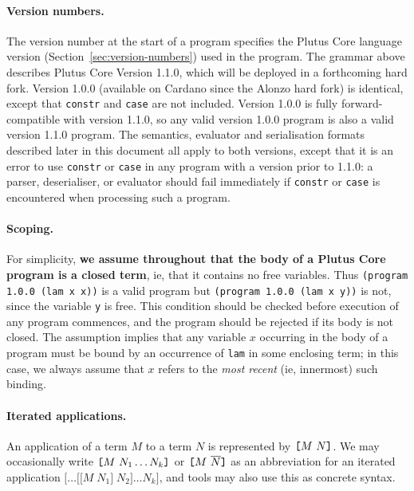 \paragraph{Version numbers.} The version number at the start of a program specifies
the Plutus Core language version (Section~\ref{sec:version-numbers}) used in the
program.  The grammar above describes Plutus Core Version 1.1.0, which will be
deployed in a forthcoming hard fork.  Version 1.0.0 (available on Cardano since
the Alonzo hard fork) is identical, except that \texttt{constr} and
\texttt{case} are not included.  Version 1.0.0 is fully forward-compatible with
version 1.1.0, so any valid version 1.0.0 program is also a valid version 1.1.0
program.  The semantics, evaluator and serialisation formats described later in
this document all apply to both versions, except that it is an error to use
\texttt{constr} or \texttt{case} in any program with a version prior to 1.1.0: a
parser, deserialiser, or evaluator should fail immediately if \texttt{constr} or
\texttt{case} is encountered when processing such a program.


\paragraph{Scoping.} For simplicity, \textbf{we assume throughout that the body of a
Plutus Core program is a closed term}, ie, that it contains no free variables.
Thus \texttt{(program 1.0.0 (lam x x))} is a valid program but \texttt{(program
  1.0.0 (lam x y))} is not, since the variable \texttt{y} is free. This
condition should be checked before execution of any program commences, and the
program should be rejected if its body is not closed.  The assumption implies
that any variable $x$ occurring in the body of a program must be bound by an
occurrence of \texttt{lam} in some enclosing term; in this case, we always
assume that $x$ refers to the \textit{most recent} (ie, innermost) such binding.

\paragraph{Iterated applications.}
An application of a term $M$ to a term $N$ is represented by
$\texttt{[} M ~ N \texttt{]}$. We may occasionally write
$\texttt{[} M ~ N_1 \ldots N_k \texttt{]}$ or
$\texttt{[} M ~ \overline{N} \texttt{]}$ as an abbreviation for an iterated application
$\mathtt{[}\ldots\mathtt{[[}M\;N_1\mathtt{]}\;N_2\mathtt{]}\ldots N_k\mathtt{]}$,
and tools may also use this as concrete syntax.


